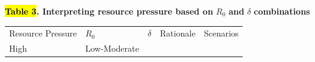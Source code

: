 \textbf{\hl{Table 3}. Interpreting resource pressure based on} \(R_{0}\) \textbf{and} \(\delta\) \textbf{combinations}

{\def\LTcaptype{none} %
\begin{longtable}[]{@{}
  >{\raggedright\arraybackslash}p{}
  >{\raggedright\arraybackslash}p{}
  >{\raggedright\arraybackslash}p{}
  >{\raggedright\arraybackslash}p{}
  >{\raggedright\arraybackslash}p{}@{}}
\toprule\noalign{}
\begin{minipage}[b]{\linewidth}\centering
Resource Pressure
\end{minipage} & \begin{minipage}[b]{\linewidth}\centering
\(R_{0}\)
\end{minipage} & \begin{minipage}[b]{\linewidth}\centering
\(\delta\)
\end{minipage} & \begin{minipage}[b]{\linewidth}\centering
Rationale
\end{minipage} & \begin{minipage}[b]{\linewidth}\centering
Scenarios
\end{minipage} \\
\begin{minipage}[b]{\linewidth}\raggedright
High
\end{minipage} & \begin{minipage}[b]{\linewidth}\raggedright
Low-Moderate


\end{minipage}
\end{longtable}}
